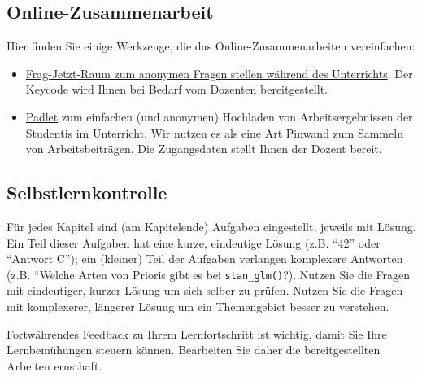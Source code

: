 \documentclass[
  a4paper,
  DIV=11]{scrreprt}
\providecommand{\tightlist}{%
  \setlength{\itemsep}{0pt}\setlength{\parskip}{0pt}}\usepackage{longtable,booktabs,array}
\theoremstyle{definition}
\theoremstyle{remark}
\begin{document}
\hypertarget{online-zusammenarbeit}{%
\subsection*{Online-Zusammenarbeit}\label{online-zusammenarbeit}}

Hier finden Sie einige Werkzeuge, die das Online-Zusammenarbeiten
vereinfachen:

\begin{itemize}
\tightlist
\item
  \href{https://frag.jetzt/home}{Frag-Jetzt-Raum zum anonymen Fragen
  stellen während des Unterrichts}. Der Keycode wird Ihnen bei Bedarf
  vom Dozenten bereitgestellt.
\item
  \href{https://de.padlet.com/}{Padlet} zum einfachen (und anonymen)
  Hochladen von Arbeitsergebnissen der Studentis im Unterricht. Wir
  nutzen es als eine Art Pinwand zum Sammeln von Arbeitsbeiträgen. Die
  Zugangsdaten stellt Ihnen der Dozent bereit.
\end{itemize}

\hypertarget{selbstlernkontrolle}{%
\subsection*{Selbstlernkontrolle}\label{selbstlernkontrolle}}

Für jedes Kapitel sind (am Kapitelende) Aufgaben eingestellt, jeweils
mit Lösung. Ein Teil dieser Aufgaben hat eine kurze, eindeutige Lösung
(z.B. ``42'' oder ``Antwort C''); ein (kleiner) Teil der Aufgaben
verlangen komplexere Antworten (z.B. ``Welche Arten von Prioris gibt es
bei \texttt{stan\_glm()}?). Nutzen Sie die Fragen mit eindeutiger,
kurzer Lösung um sich selber zu prüfen. Nutzen Sie die Fragen mit
komplexerer, längerer Lösung um ein Themengebiet besser zu verstehen.

\begin{tcolorbox}[enhanced jigsaw, title=\textcolor{quarto-callout-note-color}{\faInfo}\hspace{0.5em}{Hinweis}, bottomtitle=1mm, bottomrule=.15mm, titlerule=0mm, colbacktitle=quarto-callout-note-color!10!white, colframe=quarto-callout-note-color-frame, leftrule=.75mm, left=2mm, toprule=.15mm, colback=white, arc=.35mm, breakable, toptitle=1mm, opacityback=0, rightrule=.15mm, coltitle=black, opacitybacktitle=0.6]

Fortwährendes Feedback zu Ihrem Lernfortschritt ist wichtig, damit Sie
Ihre Lernbemühungen steuern können. Bearbeiten Sie daher die
bereitgestellten Arbeiten ernsthaft.

\end{tcolorbox}
\end{document}

